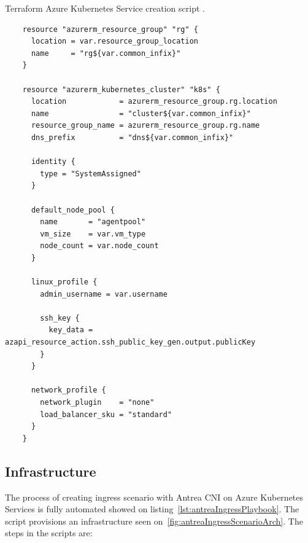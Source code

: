 \begin{listing}[htb]
  \centering
  \caption{Terraform Azure Kubernetes Service creation script \cite{AKS}.}
  \begin{verbatim}
    resource "azurerm_resource_group" "rg" {
      location = var.resource_group_location
      name     = "rg${var.common_infix}"
    }

    resource "azurerm_kubernetes_cluster" "k8s" {
      location            = azurerm_resource_group.rg.location
      name                = "cluster${var.common_infix}"
      resource_group_name = azurerm_resource_group.rg.name
      dns_prefix          = "dns${var.common_infix}"

      identity {
        type = "SystemAssigned"
      }

      default_node_pool {
        name       = "agentpool"
        vm_size    = var.vm_type
        node_count = var.node_count
      }

      linux_profile {
        admin_username = var.username

        ssh_key {
          key_data = azapi_resource_action.ssh_public_key_gen.output.publicKey
        }
      }

      network_profile {
        network_plugin    = "none"
        load_balancer_sku = "standard"
      }
    }
  \end{verbatim}
  \label{lst:terraformScript}
\end{listing}


\subsection{Infrastructure}
\label{sec:infra}

The process of creating ingress scenario with Antrea CNI on Azure Kubernetes Services is fully automated showed on listing~\ref{lst:antreaIngressPlaybook}. The script provisions an infrastructure seen on~\ref{fig:antreaIngressScenarioArch}. The steps in the scripts are: 



